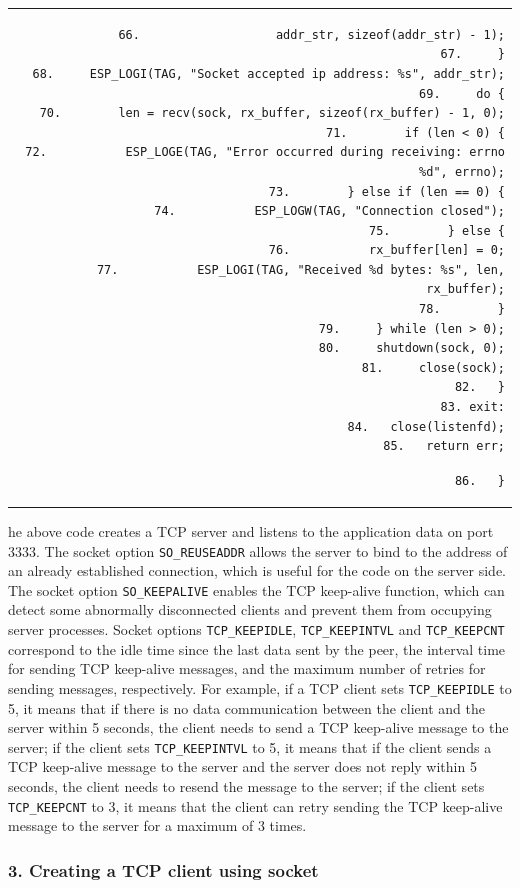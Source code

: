 \documentclass[a4paper,12pt,openany]{book}
\renewcommand{\ttfamily}{\fontfamily{pcr}\selectfont}
\renewcommand{\arraystretch}{1}
\newenvironment{codebloc}{ %
    \ttfamily\footnotesize
    \renewcommand{\arraystretch}{1}
}
\newcommand{\note}[2][NOTE]{ %
\vspace{6pt}
\begin{tabular}{b{\textwidth}}
\hline
\fontfamily{phv}\selectfont \textbf{#1}\\
\leftskip 1em #2\\
\hline
\end{tabular}
}
\begin{document}
\begin{codebloc}
\begin{tabular}{d}
\vspace{2pt}
\begin{verbatim}
66.                   addr_str, sizeof(addr_str) - 1);
67.     }
68.     ESP_LOGI(TAG, "Socket accepted ip address: %s", addr_str);
69.     do {
70.        len = recv(sock, rx_buffer, sizeof(rx_buffer) - 1, 0);
71.        if (len < 0) {
72.           ESP_LOGE(TAG, "Error occurred during receiving: errno %d", errno);
73.        } else if (len == 0) {
74.           ESP_LOGW(TAG, "Connection closed");
75.        } else {
76.           rx_buffer[len] = 0;
77.           ESP_LOGI(TAG, "Received %d bytes: %s", len, rx_buffer);
78.        }
79.     } while (len > 0);
80.     shutdown(sock, 0);
81.     close(sock);
82.   }
83.	exit:
84.   close(listenfd);
85.   return err;
\end{verbatim}
\verb|86.	}|
\end{tabular}
\end{codebloc}

The above code creates a TCP server and listens to the application data on port 3333. The socket option \verb|SO_REUSEADDR| allows the server to bind to the address of an already established connection, which is useful for the code on the server side. The socket option \verb|SO_KEEPALIVE| enables the TCP keep-alive function, which can detect some abnormally disconnected clients and prevent them from occupying server processes. Socket options \verb|TCP_KEEPIDLE|, \verb|TCP_KEEPINTVL| and \verb|TCP_KEEPCNT| correspond to the idle time since the last data sent by the peer, the interval time for sending TCP keep-alive messages, and the maximum number of retries for sending messages, respectively. For example, if a TCP client sets \verb|TCP_KEEPIDLE| to 5, it means that if there is no data communication between the client and the server within 5 seconds, the client needs to send a TCP keep-alive message to the server; if the client sets \verb|TCP_KEEPINTVL| to 5, it means that if the client sends a TCP keep-alive message to the server and the server does not reply within 5 seconds, the client needs to resend the message to the server; if the client sets \verb|TCP_KEEPCNT| to 3, it means that the client can retry sending the TCP keep-alive message to the server for a maximum of 3 times.

\subsubsection{3. Creating a TCP client using socket}
\end{document}
